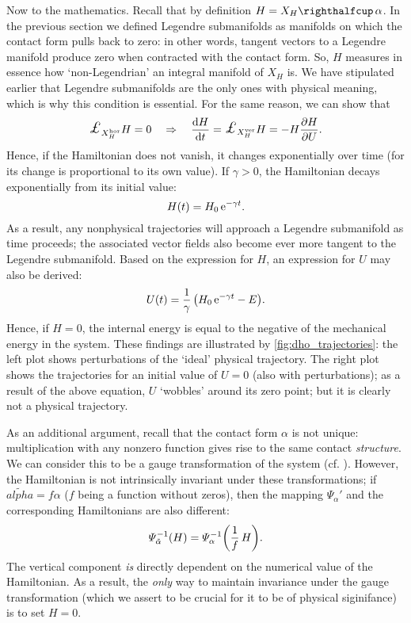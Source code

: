 Now to the mathematics. Recall that by definition $H = \intpr{X_H}{\alpha}$. In the previous section we defined Legendre submanifolds as manifolds on which the contact form pulls back to zero: in other words, tangent vectors to a Legendre manifold produce zero when contracted with the contact form. So, $H$ measures in essence how `non-Legendrian' an integral manifold of $X_H$ is. We have stipulated earlier that Legendre submanifolds are the only ones with physical meaning, which is why this condition is essential. For the same reason, we can show that
$$ \lied{X^{\text{hor}}_H}{H} = 0 \quad \Rightarrow \quad \dv{H}{t} = \lied{X^{\text{ver}}_H}{H} = -H\pdv{H}{U}. $$
Hence, if the Hamiltonian does not vanish, it changes exponentially over time (for its change is proportional to its own value). If $\gamma > 0$, the Hamiltonian decays exponentially from its initial value:
$$ H(t) = H_0\,\mathrm{e}^{-\gamma t}.$$
As a result, any nonphysical trajectories will approach a Legendre submanifold as time proceeds; the associated vector fields also become ever more tangent to the Legendre submanifold. Based on the expression for $H$, an expression for $U$ may also be derived:
$$ U(t) = \frac{1}{\gamma}\,\qty( H_0\,\mathrm{e}^{-\gamma t} - E ). $$
Hence, if $H = 0$, the internal energy is equal to the negative of the mechanical energy in the system. These findings are illustrated by \cref{fig:dho_trajectories}: the left plot shows perturbations of the `ideal' physical trajectory. The right plot shows the trajectories for an initial value of $U = 0$ (also with perturbations); as a result of the above equation, $U$ `wobbles' around its zero point; but it is clearly not a physical trajectory.

As an additional argument, recall that the contact form $\alpha$ is not unique: multiplication with any nonzero function gives rise to the same contact \emph{structure}. We can consider this to be a gauge transformation of the system (cf. \citet{Balian2001}). However, the Hamiltonian is not intrinsically invariant under these transformations; if $ \tilde{alpha} = f \alpha $ ($f$ being a function without zeros), then the mapping $\Psi_\alpha'$ and the corresponding Hamiltonians are also different: \cite[p. 321]{Libermann1987} 
\begin{equation}
    \Psi^{-1}_{\tilde{\alpha}}(H) = \Psi^{-1}_{\alpha}\qty(\frac{1}{f}\,H).
    \label{eq:contact_ham_scaling}
\end{equation}
The vertical component \emph{is} directly dependent on the numerical value of the Hamiltonian. As a result, the \emph{only} way to maintain invariance under the gauge transformation (which we assert to be crucial for it to be of physical siginifance) is to set $H = 0$.

